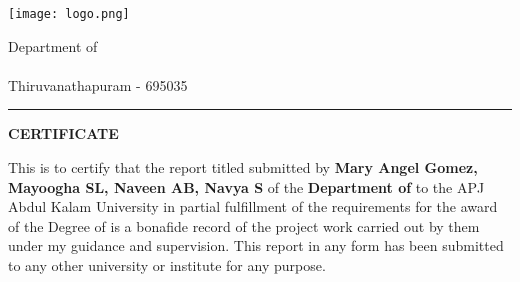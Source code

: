 \thispagestyle{plain}
\noindent
\begin{minipage}{0.30\textwidth}
\texttt{[image: logo.png]}
\end{minipage}
\begin{minipage}{0.70\textwidth}

 Department of \Department \\
 \University \\
 Thiruvanathapuram - 695035
\end{minipage}

\vspace{0.5\baselineskip}
\hrule
\vspace{2\baselineskip}

\begin{center}
{\Large {\bf \uppercase{Certificate}}}
\end{center}

\vspace{\baselineskip}

\noindent 

This is to certify that the report titled {\bf \ReportTitle}submitted by {\bf Mary Angel Gomez, Mayoogha SL, Naveen AB, Navya S} of the {\bf Department of \Department} to the APJ Abdul Kalam
University in partial fulfillment of the requirements for the award of the Degree of \emph{\Degree} is a bonafide record of the project work
carried out by them under my guidance and supervision. This report in any form has been
submitted
to
any
other
university
or
institute
for
any
purpose.

\vspace{4\baselineskip}

